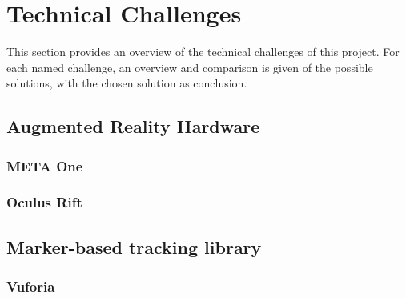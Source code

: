 \chapter{Technical Challenges} \label{ch:technicalchallenges}
	This section provides an overview of the technical challenges of 
	this project. For each named challenge, an overview and comparison is 
	given of the possible solutions, with the chosen solution as conclusion.
	
	\section{Augmented Reality Hardware} \label{sec:arhardware}
	
		\subsection{META One} \label{ssec:metaone}
		\subsection{Oculus Rift} \label{ssec:oculusrift}
	
	
	\section{Marker-based tracking library} \label{sec:trackinglib}
	
		\subsection{Vuforia} \label{ssec:vuforia}
